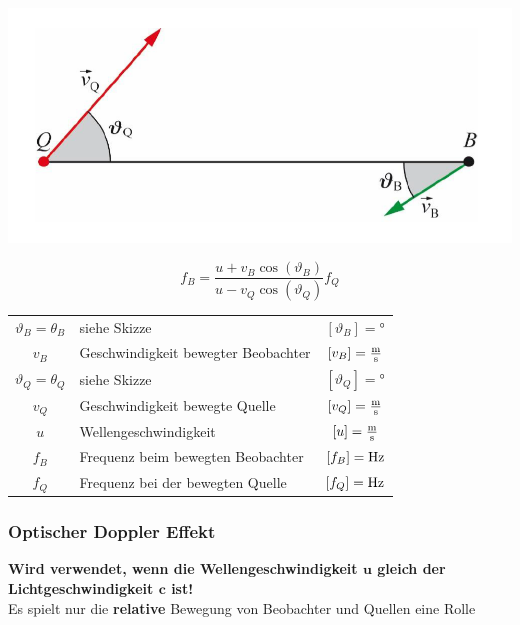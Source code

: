 \begin{minipage}{0.48\linewidth}
\includegraphics[width=0.98\linewidth]{Bilder/Wellen-Optik/akustischer_doppler_effekt} \\
\end{minipage}
\hfill
\begin{minipage}{0.48\linewidth}
$$ \boxed{f_B = \frac{u+ v_B \cos(\vartheta_B)}{u- v_Q \cos(\vartheta_Q)}f_Q} $$
\end{minipage}

\renewcommand{\arraystretch}{1.1}
\begin{tabular}{clc}
$\vartheta_B = \theta_B$ & siehe Skizze & $[\vartheta_B] = $°\\
$v_B$ & Geschwindigkeit bewegter Beobachter & $[v_B] = \frac{\mathrm{m}}{\mathrm{s}}$ \\
$\vartheta_Q = \theta_Q$ & siehe Skizze & $[\vartheta_Q] = $°\\
$v_Q$ & Geschwindigkeit bewegte Quelle & $[v_Q] = \frac{\mathrm{m}}{\mathrm{s}}$ \\
$u$ & Wellengeschwindigkeit & $[u] = \frac{\mathrm{m}}{\mathrm{s}}$ \\
$f_B$ & Frequenz beim bewegten Beobachter & $[f_B] = \mathrm{Hz}$ \\
$f_Q$ & Frequenz bei der bewegten Quelle & $[f_Q] = \mathrm{Hz}$ \\
\end{tabular}
\renewcommand{\arraystretch}{1}



\subsubsection{Optischer Doppler Effekt}

\textbf{Wird verwendet, wenn die Wellengeschwindigkeit $\boldsymbol{u}$ gleich der Lichtgeschwindigkeit $\boldsymbol{c}$ ist!} \\

Es spielt nur die \textbf{relative} Bewegung von Beobachter und Quellen eine Rolle

